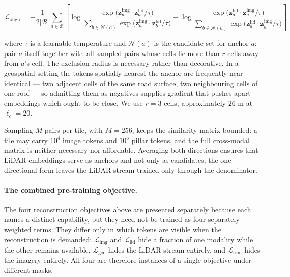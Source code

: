 \documentclass{book}
\begin{document}
\begin{equation}
  \mathcal{L}_{\text{align}} =
    -\frac{1}{2|\mathcal{B}|}
    \sum_{a \in \mathcal{B}}
    \left[
      \log \frac{
        \exp\!\bigl(
          \mathbf{z}^{\text{img}}_a \cdot
          \mathbf{z}^{\text{lid}}_a / \tau
        \bigr)
      }{
        \sum_{b \in \mathcal{N}(a)}
        \exp\!\bigl(
          \mathbf{z}^{\text{img}}_a \cdot
          \mathbf{z}^{\text{lid}}_b / \tau
        \bigr)
      }
      +
      \log \frac{
        \exp\!\bigl(
          \mathbf{z}^{\text{lid}}_a \cdot
          \mathbf{z}^{\text{img}}_a / \tau
        \bigr)
      }{
        \sum_{b \in \mathcal{N}(a)}
        \exp\!\bigl(
          \mathbf{z}^{\text{lid}}_a \cdot
          \mathbf{z}^{\text{img}}_b / \tau
        \bigr)
      }
    \right]
  \label{eq:contrastive}
\end{equation}

where $\tau$ is a learnable temperature and $\mathcal{N}(a)$ is the
candidate set for anchor $a$: pair $a$ itself together with all
sampled pairs whose cells lie more than $r$ cells away from $a$'s
cell.  The exclusion radius is necessary rather than decorative.  In
a geospatial setting the tokens spatially nearest the anchor are
frequently near-identical --- two adjacent cells of the same road
surface, two neighbouring cells of one roof --- so admitting them as
negatives supplies gradient that pushes apart embeddings which ought
to be close.  We use $r = 3$ cells, approximately $26$ m at
$\ell_c = 20$.

Sampling $M$ pairs per tile, with $M = 256$, keeps the similarity
matrix bounded: a tile may carry $10^4$ image tokens and $10^5$
pillar tokens, and the full cross-modal matrix is neither necessary
nor affordable.  Averaging both directions ensures that LiDAR
embeddings serve as anchors and not only as candidates; the
one-directional form leaves the LiDAR stream trained only through
the denominator.

\paragraph{The combined pre-training objective.}

The four reconstruction objectives above are presented separately
because each names a distinct capability, but they need not be
trained as four separately weighted terms.  They differ only in
which tokens are visible when the reconstruction is demanded:
$\mathcal{L}_{\text{img}}$ and $\mathcal{L}_{\text{lid}}$ hide a
fraction of one modality while the other remains available,
$\mathcal{L}_{\text{geo}}$ hides the LiDAR stream entirely, and
$\mathcal{L}_{\text{sem}}$ hides the imagery entirely.  All four
are therefore instances of a single objective under different
masks.
\end{document}
